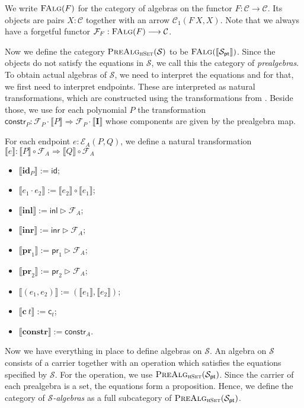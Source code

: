 \documentclass[9pt]{entcs}
\newcommand{\type}[1]{\textsc{#1}}
\newcommand{\constructor}[1]{\mathbf{#1}}
\newcommand{\category}[1]{\textsc{#1}}
\newcommand{\nattranstxt}[1]{\mathsf{#1}}
\newcommand{\hset}{\type{hSet}} %
\newcommand{\0}{\textbf{0}} %
\newcommand{\1}{\textbf{1}} %
\newcommand{\Def}{:=} %
\newcommand{\functor}[2]{#1 \longrightarrow #2} %
\newcommand{\compf}[2]{#2 \circ #1} %
\newcommand{\nattrans}[2]{#1 \Longrightarrow #2} %
\newcommand{\ctrans}[1]{\nattranstxt{c}_{#1}} %
\newcommand{\constrt}[1]{\nattranstxt{constr}_{#1}} %
\newcommand{\idt}[1]{\nattranstxt{id}} %
\newcommand{\compt}[2]{#2 \circ #1} %
\newcommand{\lwhisker}[2]{#2 \vartriangleright #1} %
\newcommand{\inlt}{\nattranstxt{inl}} %
\newcommand{\inrt}{\nattranstxt{inr}} %
\newcommand{\prlt}{\nattranstxt{pr}_1} %
\newcommand{\prrt}{\nattranstxt{pr}_2} %
\newcommand{\pairt}[2]{(#1 , #2)} %
\newcommand{\falg}[1]{\category{FAlg}(#1)} %
\newcommand{\I}{\constructor{I}} %
\newcommand{\ep}[3]{\mathcal{E}_{#1}(#2,#3)} %
\newcommand{\id}[1]{\constructor{id}_{#1}} %
\newcommand{\comp}[2]{#1 \cdot #2} %
\newcommand{\inle}{\constructor{inl}} %
\newcommand{\inre}{\constructor{inr}} %
\newcommand{\prle}{\constructor{pr}_1} %
\newcommand{\prre}{\constructor{pr}_2} %
\newcommand{\pair}[2]{(#1 , #2)} %
\newcommand{\Ce}{\constructor{c}} %
\newcommand{\constr}{\constructor{constr}} %
\newcommand{\pt}[0]{\textsf{pt}}
\newcommand{\pointc}[1]{#1_{\pt}} %
\newcommand{\sig}{\mathcal{S}} %
\newcommand{\semP}[1]{\llbracket #1 \rrbracket} %
\newcommand{\prealg}[1]{\category{PreAlg}_{\hset}(#1)} %
\newcommand{\forget}[1]{\mathcal{F}_{#1}} %
\newcommand{\semE}[1]{\llbracket #1 \rrbracket} %
\begin{document}
We write $\falg{F}$ for the category of algebras on the functor $F : \functor{\mathcal{C}}{\mathcal{C}}$.
Its objects are pairs $X : \mathcal{C}$ together with an arrow $\mathcal{C}_1(F \> X, X)$.
Note that we always have a forgetful functor $\forget{F} : \functor{\falg{F}}{\mathcal{C}}$.

Now we define the category $\prealg{\sig}$ to be $\falg{\semP{\pointc{\sig}}}$.
Since the objects do not satisfy the equations in $\sig$, we call this the category of \emph{prealgebras}.
To obtain actual algebras of $\sig$, we need to interpret the equations and for that, we first need to interpret endpoints.
These are interpreted as natural transformations, which are constructed using the transformations from .
Beside those, we use for each polynomial $P$ the transformation $\constrt{P} : \nattrans{\comp{\forget{P}}{\semP{P}}}{\comp{\forget{P}}{\semP{\I}}}$ whose  components are given by the prealgebra map.

\begin{definition}
\label{def:semendpoint}
For each endpoint $e : \ep{A}{P}{Q}$, we define a natural transformation $\semE{e} : \nattrans{\compf{\forget{A}}{\semP{P}}} {\compf{\forget{A}}{\semP{Q}}}$
\begin{itemize}
	\item $\semE{\id{P}} \Def \idt{\compf{\forget{A}}{\semP{P}}}$;
	\item $\semE{\comp{e_1}{e_2}} \Def \compt{\semE{e_1}}{\semE{e_2}}$;
	\item $\semE{\inle} \Def \lwhisker{\forget{A}}{\inlt}$;
	\item $\semE{\inre} \Def \lwhisker{\forget{A}}{\inrt}$;
	\item $\semE{\prle} \Def \lwhisker{\forget{A}}{\prlt}$;
	\item $\semE{\prre} \Def \lwhisker{\forget{A}}{\prrt}$;
	\item $\semE{\pair{e_1}{e_2}} \Def \pairt{\semE{e_1}}{\semE{e_2}}$;
	\item $\semE{\Ce \> t} \Def \ctrans{t}$;
	\item $\semE{\constr} \Def \constrt{A}$.
\end{itemize}
\end{definition}

Now we have everything in place to define algebras on $\sig$.
An algebra on $\sig$ consists of a carrier together with an operation which satisfies the equations specified by $\sig$.
For the operation, we use $\prealg{\pointc{\sig}}$.
Since the carrier of each prealgebra is a set, the equations form a proposition.
Hence, we define the category of \emph{$\sig$-algebras} as a full subcategory of $\prealg{\pointc{\sig}}$.
\end{document}
